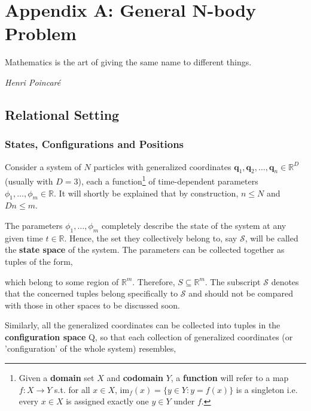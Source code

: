 \documentclass[oneside]{book}
\newcommand{\hook}{\overset{\hookrightarrow}}
\begin{document}


\chapter{Appendix A: General N-body Problem}
\label{appendix_A}

\epigraph{Mathematics is the art of giving the same name to different things.}{\textit{Henri Poincar\'{e}}}

\section{Relational Setting}

\subsection{States, Configurations and Positions}

Consider a system of $N$ particles with generalized coordinates $\pmb{q}_1, \pmb{q}_2, \dots, \pmb{q}_n \in \mathbb{R}^D$ (usually with $D = 3$), each a function\footnote{Given a \textbf{domain} set $X$ and \textbf{codomain} $Y$, a \textbf{function} will refer to a map $f : X \to Y$ s.t. for all $x \in X$, $\text{im}_f(x) = \{ y \in Y : y = f(x) \}$ is a singleton i.e. every $x \in X$ is assigned exactly one $y \in Y$ under $f$.\label{function_defn}} of time-dependent parameters $\phi_1, \dots, \phi_m \in \mathbb{R}$. It will shortly be explained that by construction, $n \leq N$ and $Dn \leq m$.

The parameters $\phi_1, \dots, \phi_m$ completely describe the state of the system at any given time $t \in \mathbb{R}$. Hence, the set they collectively belong to, say $\mathcal{S}$, will be called the \textbf{state space} of the system. The parameters can be collected together as tuples of the form,

\defn{States}{
$$\hook{\phi}(t) = (\phi_1(t), \dots, \phi_m(t))_\mathcal{S} \in \mathcal{S}$$ 
}
\label{states_defn}

which belong to some region of $\mathbb{R}^m$. Therefore, $\boxed{S \subseteq \mathbb{R}^m}$. The subscript $\mathcal{S}$ denotes that the concerned tuples belong specifically to $\mathcal{S}$ and should not be compared with those in other spaces to be discussed soon.

Similarly, all the generalized coordinates can be collected into tuples in the \textbf{configuration space} Q, so that each collection of generalized coordinates (or 'configuration' of the whole system) resembles,
\end{document}
